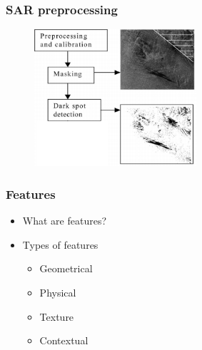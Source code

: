 \documentclass{beamer}
\begin{document}

\begin{frame}
\frametitle{SAR preprocessing}

	\begin{figure}
		\centering
    	\includegraphics[width=60mm,scale=1]{./img/preprocessing_diagram.png}
	\end{figure}
	
\end{frame}


\begin{frame}
\frametitle{Features}

	\begin{itemize}
		\item What are features?
		\item Types of features 
			\begin{itemize}
				\item Geometrical 
				\item Physical 
				\item Texture 
				\item Contextual  
			\end{itemize}	
	\end{itemize}

\end{frame}

\end{document}
